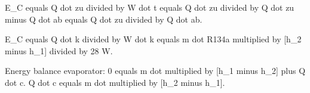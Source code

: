 E_C equals Q dot zu divided by W dot t equals Q dot zu divided by Q dot zu minus Q dot ab equals Q dot zu divided by Q dot ab.  

E_C equals Q dot k divided by W dot k equals m dot R134a multiplied by [h_2 minus h_1] divided by 28 W.  

Energy balance evaporator:  
0 equals m dot multiplied by [h_1 minus h_2] plus Q dot c.  
Q dot c equals m dot multiplied by [h_2 minus h_1].
